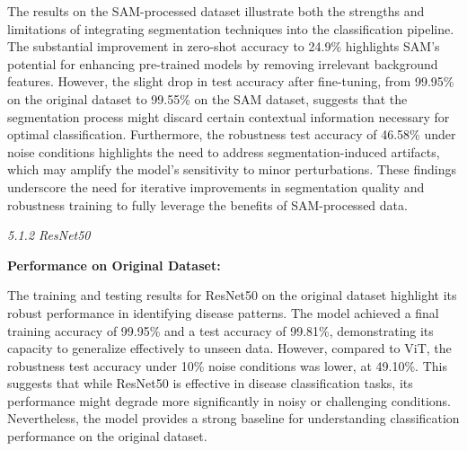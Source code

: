 \documentclass{article}
\begin{document}
The results on the SAM-processed dataset illustrate both the strengths and limitations of integrating segmentation techniques into the classification pipeline. The substantial improvement in zero-shot accuracy to 24.9\% highlights SAM's potential for enhancing pre-trained models by removing irrelevant background features. However, the slight drop in test accuracy after fine-tuning, from 99.95\% on the original dataset to 99.55\% on the SAM dataset, suggests that the segmentation process might discard certain contextual information necessary for optimal classification. Furthermore, the robustness test accuracy of 46.58\% under noise conditions highlights the need to address segmentation-induced artifacts, which may amplify the model's sensitivity to minor perturbations. These findings underscore the need for iterative improvements in segmentation quality and robustness training to fully leverage the benefits of SAM-processed data.

\textit{5.1.2 ResNet50}


\textbf{Performance on Original Dataset:}

\begin{table}[h!]
\centering
{}
\captionsetup{font=small}
\caption{Performance Metrics of ResNet50 on the Original Dataset}
\label{tab:resnet50_metrics}
\end{table}

The training and testing results for ResNet50 on the original dataset highlight its robust performance in identifying disease patterns. The model achieved a final training accuracy of 99.95\% and a test accuracy of 99.81\%, demonstrating its capacity to generalize effectively to unseen data. However, compared to ViT, the robustness test accuracy under 10\% noise conditions was lower, at 49.10\%. This suggests that while ResNet50 is effective in disease classification tasks, its performance might degrade more significantly in noisy or challenging conditions. Nevertheless, the model provides a strong baseline for understanding classification performance on the original dataset.
\end{document}
